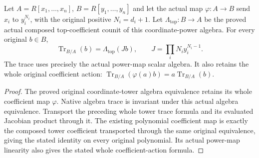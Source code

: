 \begin{theorem}
\label{thm:kn-nadel-polynomial-trace-jacobian}
\leanok
{}
Let $A=R[x_1,\ldots,x_n]$, $B=R[y_1,\ldots,y_n]$ and let the actual map
$\varphi:A\to B$ send $x_i$ to $y_i^{N_i}$, with the original positive
$N_i=d_i+1$.  Let $\Lambda_{\mathrm{top}}:B\to A$ be the proved actual
composed top-coefficient counit of this coordinate-power algebra.  For
every original $b\in B$,
\[
 \operatorname{Tr}_{B/A}(b)=\Lambda_{\mathrm{top}}(Jb),\qquad
 J=\prod_i N_i y_i^{N_i-1}.
\]
The trace uses precisely the actual power-map scalar algebra.  It also
retains the whole original coefficient action:
$\operatorname{Tr}_{B/A}(\varphi(a)b)=a\operatorname{Tr}_{B/A}(b)$.
\end{theorem}
\begin{proof}
The proved original coordinate-tower algebra equivalence retains its whole
coefficient map $\varphi$.  Native algebra trace is invariant under this
actual algebra equivalence.  Transport the preceding whole tower trace
formula and its evaluated Jacobian product through it.  The existing
polynomial coefficient map is exactly the composed tower coefficient
transported through the same original equivalence, giving the stated
identity on every original polynomial.  Its actual power-map linearity
also gives the stated whole coefficient-action formula.
\end{proof}

